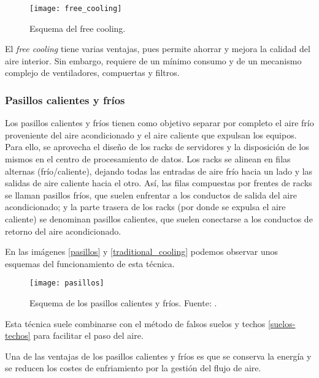 \begin{figure}
    \begin{center}
        \texttt{[image: free\_cooling]}
        \caption{Esquema del free cooling.}
        \label{free_coling}
    \end{center}
\end{figure}

El \textit{free cooling} tiene varias ventajas, pues permite ahorrar y mejora la calidad del aire interior. Sin embargo, requiere de un mínimo consumo y de un mecanismo complejo de ventiladores, compuertas y filtros.

\subsubsection{Pasillos calientes y fríos}

Los pasillos calientes y fríos tienen como objetivo separar por completo el aire frío proveniente del aire acondicionado y el aire caliente que expulsan los equipos. Para ello, se aprovecha el diseño de los racks de servidores y la disposición de los mismos en el centro de procesamiento de datos.  Los racks se alinean en filas alternas (frío/caliente), dejando todas las entradas de aire frío hacia un lado y las salidas de aire caliente hacia el otro. Así, las filas compuestas por frentes de racks se llaman pasillos fríos, que suelen enfrentar a los conductos de salida del aire acondicionado; y la parte trasera de los racks (por donde se expulsa el aire caliente) se denominan pasillos calientes, que suelen conectarse a los conductos de retorno del aire acondicionado.

En las imágenes \eqref{pasillos} y \eqref{traditional_cooling} podemos observar unos esquemas del funcionamiento de esta técnica.

\begin{figure}
    \begin{center}
        \texttt{[image: pasillos]}
        \caption{Esquema de los pasillos calientes y fríos. Fuente: \cite{Kelvion}.}
        \label{pasillos}
    \end{center}
\end{figure}

Esta técnica suele combinarse con el método de falsos suelos y techos \ref{suelos-techos} para facilitar el paso del aire.

Una de las ventajas de los pasillos calientes y fríos es que se conserva la energía y se reducen los costes de enfriamiento por la gestión del flujo de aire.

